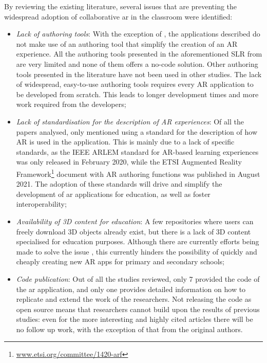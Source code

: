 By reviewing the existing literature, several issues that are preventing the widespread adoption of collaborative \gls{ar} in the classroom were identified:
\begin{itemize}
    \item \textit{Lack of authoring tools}: With the exception of \cite{lytridis2018artutor, whitlock2020mrcat, farella2021augmented, farella2022arete}, the applications described do not make use of an authoring tool that simplify the creation of an AR experience. All the authoring tools presented in the aforementioned SLR from \cite{dengel2022review} are very limited and none of them offers a no-code solution. Other authoring tools presented in the literature \citep{rajaram2022paper, blattgerste2023trainar} have not been used in other studies. The lack of widespread, easy-to-use authoring tools requires every AR application to be developed from scratch. This leads to longer development times and more work required from the developers;
    \item \textit{Lack of standardisation for the description of AR experiences}: Of all the papers analysed, only \cite{farella2022arete} mentioned using a standard for the description of how AR is used in the application. This is mainly due to a lack of specific standards, as the IEEE ARLEM standard \citep{arlem2020} for AR-based learning experiences was only released in February 2020, while the ETSI Augmented Reality Framework\footnote{\url{www.etsi.org/committee/1420-arf}} document with AR authoring functions was published in August 2021. The adoption of these standards will drive and simplify the development of \gls{ar} applications for education, as well as foster interoperability;
    \item \textit{Availability of 3D content for education}: A few repositories where users can freely download 3D objects already exist, but there is a lack of 3D content specialised for education purposes. Although there are currently efforts being made to solve the issue \citep{masneri2020work, deitke2023objaversexl}, this currently hinders the possibility of quickly and cheaply creating new AR apps for primary and secondary schools;
    \item \textit{Code publication}: Out of all the studies reviewed, only 7 provided the code of the \gls{ar} application, and only one \citep{wellmann2022open} provides detailed information on how to replicate and extend the work of the researchers. Not releasing the code as open source means that researchers cannot build upon the results of previous studies: even for the more interesting and highly cited articles there will be no follow up work, with the exception of that from the original authors.
\end{itemize}


